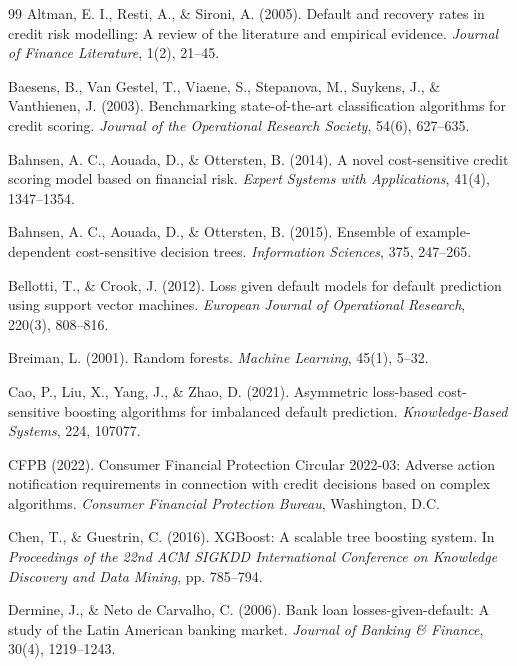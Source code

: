 \documentclass[11pt,a4paper]{article}
\begin{document}

\begin{thebibliography}{99}
Altman, E. I., Resti, A., \& Sironi, A. (2005). Default and recovery rates in credit risk modelling: A review of the literature and empirical evidence. \textit{Journal of Finance Literature}, 1(2), 21--45.

Baesens, B., Van Gestel, T., Viaene, S., Stepanova, M., Suykens, J., \& Vanthienen, J. (2003). Benchmarking state-of-the-art classification algorithms for credit scoring. \textit{Journal of the Operational Research Society}, 54(6), 627--635.

Bahnsen, A. C., Aouada, D., \& Ottersten, B. (2014). A novel cost-sensitive credit scoring model based on financial risk. \textit{Expert Systems with Applications}, 41(4), 1347--1354.

Bahnsen, A. C., Aouada, D., \& Ottersten, B. (2015). Ensemble of example-dependent cost-sensitive decision trees. \textit{Information Sciences}, 375, 247--265.

Bellotti, T., \& Crook, J. (2012). Loss given default models for default prediction using support vector machines. \textit{European Journal of Operational Research}, 220(3), 808--816.

Breiman, L. (2001). Random forests. \textit{Machine Learning}, 45(1), 5--32.

Cao, P., Liu, X., Yang, J., \& Zhao, D. (2021). Asymmetric loss-based cost-sensitive boosting algorithms for imbalanced default prediction. \textit{Knowledge-Based Systems}, 224, 107077.

CFPB (2022). Consumer Financial Protection Circular 2022-03: Adverse action notification requirements in connection with credit decisions based on complex algorithms. \textit{Consumer Financial Protection Bureau}, Washington, D.C.

Chen, T., \& Guestrin, C. (2016). XGBoost: A scalable tree boosting system. In \textit{Proceedings of the 22nd ACM SIGKDD International Conference on Knowledge Discovery and Data Mining}, pp. 785--794.

Dermine, J., \& Neto de Carvalho, C. (2006). Bank loan losses-given-default: A study of the Latin American banking market. \textit{Journal of Banking \& Finance}, 30(4), 1219--1243.


\end{thebibliography}
\end{document}
